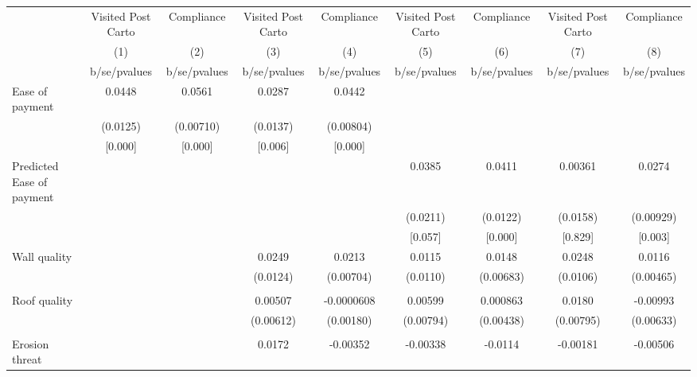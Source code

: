 {
\def\sym#1{\ifmmode^{#1}\else\(^{#1}\)\fi}
\begin{tabular}{l*{8}{c}}
\toprule
                &\multicolumn{1}{c}{Visited Post Carto}&\multicolumn{1}{c}{Compliance}&\multicolumn{1}{c}{Visited Post Carto}&\multicolumn{1}{c}{Compliance}&\multicolumn{1}{c}{Visited Post Carto}&\multicolumn{1}{c}{Compliance}&\multicolumn{1}{c}{Visited Post Carto}&\multicolumn{1}{c}{Compliance}\\
                &\multicolumn{1}{c}{(1)}&\multicolumn{1}{c}{(2)}&\multicolumn{1}{c}{(3)}&\multicolumn{1}{c}{(4)}&\multicolumn{1}{c}{(5)}&\multicolumn{1}{c}{(6)}&\multicolumn{1}{c}{(7)}&\multicolumn{1}{c}{(8)}\\
                &b/se/pvalues&b/se/pvalues&b/se/pvalues&b/se/pvalues&b/se/pvalues&b/se/pvalues&b/se/pvalues&b/se/pvalues\\
\midrule
Ease of payment &   0.0448&   0.0561&   0.0287&   0.0442&         &         &         &         \\
                & (0.0125)&(0.00710)& (0.0137)&(0.00804)&         &         &         &         \\
                &  [0.000]&  [0.000]&  [0.006]&  [0.000]&         &         &         &         \\
Predicted Ease of payment&         &         &         &         &   0.0385&   0.0411&  0.00361&   0.0274\\
                &         &         &         &         & (0.0211)& (0.0122)& (0.0158)&(0.00929)\\
                &         &         &         &         &  [0.057]&  [0.000]&  [0.829]&  [0.003]\\
Wall quality    &         &         &   0.0249&   0.0213&   0.0115&   0.0148&   0.0248&   0.0116\\
                &         &         & (0.0124)&(0.00704)& (0.0110)&(0.00683)& (0.0106)&(0.00465)\\
                &         &         &         &         &         &         &         &         \\
Roof quality    &         &         &  0.00507&-0.0000608&  0.00599& 0.000863&   0.0180& -0.00993\\
                &         &         &(0.00612)&(0.00180)&(0.00794)&(0.00438)&(0.00795)&(0.00633)\\
                &         &         &         &         &         &         &         &         \\
Erosion threat  &         &         &   0.0172& -0.00352& -0.00338&  -0.0114& -0.00181& -0.00506\\

\end{tabular}}
